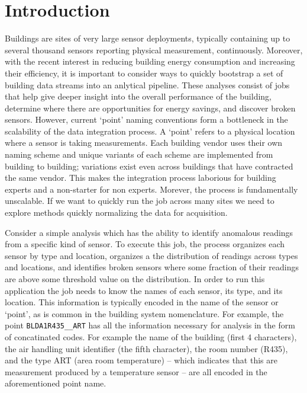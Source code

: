 \section{Introduction}

Buildings are sites of very large sensor deployments, typically containing
up to several thousand sensors reporting physical measurement, continuously.
Moreover, with the recent interest in reducing building energy consumption and
increasing their efficiency, it
is important to consider ways to quickly bootstrap a set of building data streams
into an anlytical pipeline.  These analyses consist of jobs that help give deeper
insight into the overall performance of the building, 
determine where there are opportunities for energy savings, and 
discover broken sensors.
However, current `point' naming conventions form a bottleneck in the scalability of
the data integration process.  A `point' refers to a physical location where
a sensor is taking measurements. Each building vendor uses their own naming scheme and
unique variants of each scheme are implemented from building to building; variations exist
even across buildings that have contracted the same vendor.
This makes the integration process laborious for building experts and a non-starter for 
non experts.  Morever, the process is fundamentally unscalable. 
If we want to quickly run the job across many sites we need
to explore methods quickly normalizing the data for acquisition.

Consider a simple analysis which has the ability
to identify anomalous readings from a specific kind of sensor. To execute this job, 
the process organizes each sensor by type and location, organizes a the distribution of
readings across types and locations, and identifies broken sensors where some fraction of
their readings are above some threshold value on the distribution.
In order to run this application
the job needs to know the names of each sensor, its type, and its location.  
This information is typically encoded in the name of the sensor or `point', as is
common in the building system nomenclature.  For example, the point
\texttt{BLDA1R435\_\_ART} has all the information necessary for analysis in the form of 
concatinated codes.  For example the name of
the building (first 4 characters), the air handling unit identifier (the fifth character),
the room number (R435), and the type ART (area room temperature) -- which indicates that
this are measurement produced by a temperature sensor -- are all encoded in the 
aforementioned point name.

